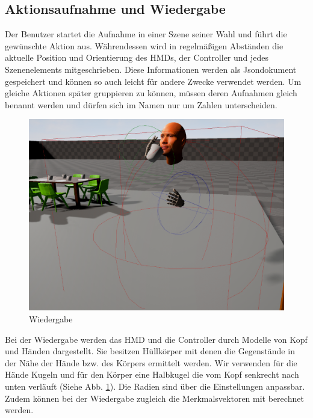 \subsection{Aktionsaufnahme und Wiedergabe}
Der Benutzer startet die Aufnahme in einer Szene seiner Wahl und führt die gewünschte Aktion aus. Währendessen wird in regelmäßigen Abständen die aktuelle Position und Orientierung des HMDs, der Controller und jedes Szenenelements mitgeschrieben. Diese Informationen werden als Jsondokument gespeichert und können so auch leicht für andere Zwecke verwendet werden. Um gleiche Aktionen später gruppieren zu können, müssen deren Aufnahmen gleich benannt werden und dürfen sich im Namen nur um Zahlen unterscheiden.\newline
\begin{figure}[hbtp]
\includegraphics[width=1.0\linewidth]{PlaybackActor2.png}
\caption{Wiedergabe}
\label{fig:PlaybackActor}
\end{figure}
Bei der Wiedergabe werden das HMD und die Controller durch Modelle von Kopf und Händen dargestellt. Sie besitzen Hüllkörper mit denen die Gegenstände in der Nähe der Hände bzw. des Körpers ermittelt werden. Wir verwenden für die Hände Kugeln und für den Körper eine Halbkugel die vom Kopf senkrecht nach unten verläuft (Siehe Abb. \ref{fig:PlaybackActor}). Die Radien sind über die Einstellungen anpassbar. Zudem können bei der Wiedergabe zugleich die Merkmalsvektoren mit berechnet werden.

